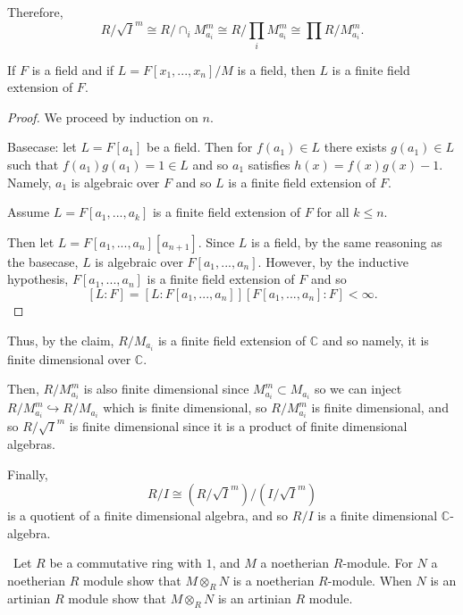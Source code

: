 \documentclass[12pt]{Qual}
\begin{document}
\begin{solution}
Therefore, $$R/\sqrt{I}^m\cong R/\cap_iM_{a_i}^m\cong R/\prod_iM_{a_i}^m\cong \prod R/M_{a_i}^m.$$

\begin{claim} If $F$ is a field and if $L=F[x_1,...,x_n]/M$ is a field, then $L$ is a finite field extension of $F$.
\begin{proof} We proceed by induction on $n.$

Basecase: let $L=F[a_1]$ be a field. Then for $f(a_1)\in L$ there exists $g(a_1)\in L$ such that $f(a_1)g(a_1)=1\in L$ and so $a_1$ satisfies $h(x)=f(x)g(x)-1$. Namely, $a_1$ is algebraic over $F$ and so $L$ is a finite field extension of $F.$

Assume $L=F[a_1,...,a_k]$ is a finite field extension of $F$ for all $k\le n$.

Then let $L=F[a_1,...,a_n][a_{n+1}]$. Since $L$ is a field, by the same reasoning as the basecase, $L$ is algebraic over $F[a_1,...,a_n]$. However, by the inductive hypothesis, $F[a_1,...,a_n]$ is a finite field extension of $F$ and so $$[L:F]=[L:F[a_1,...,a_n]][F[a_1,...,a_n]:F]<\infty.$$
\end{proof}
\end{claim}

Thus, by the claim, $R/M_{a_i}$ is a finite field extension of $\mathbb{C}$ and so namely, it is finite dimensional over $\mathbb{C}$.

Then, $R/M_{a_i}^m$ is also finite dimensional since $M_{a_i}^m\subset M_{a_i}$ so we can inject $R/M_{a_i}^m\hookrightarrow R/M_{a_i}$ which is finite dimensional, so $R/M_{a_i}^m$ is finite dimensional, and so $R/\sqrt{I}^m$ is finite dimensional since it is a product of finite dimensional algebras.

Finally, $$R/I\cong (R/\sqrt{I}^m)/(I/\sqrt{I}^m)$$ is a quotient of a finite dimensional algebra, and so $R/I$ is a finite dimensional $\mathbb{C}$-algebra.
\end{solution}
\newpage


\begin{problem} $\,$
Let $R$ be a commutative ring with $1$, and $M$ a noetherian $R$-module. For $N$ a noetherian $R$ module show that $M\otimes_R N$ is a noetherian $R$-module. When $N$ is an artinian $R$ module show that $M\otimes_RN$ is an artinian $R$ module.
\end{problem}
\end{document}
